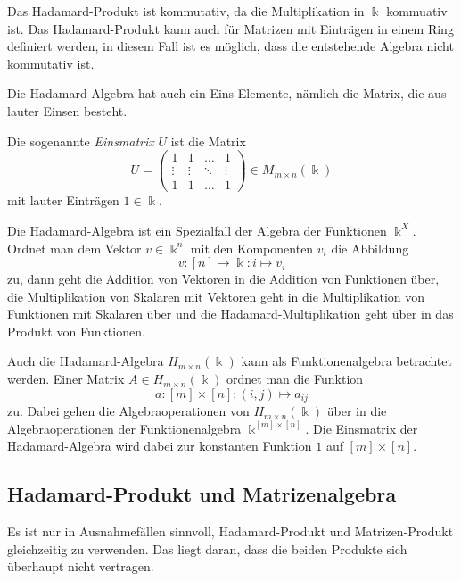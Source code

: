 Das Hadamard-Produkt ist kommutativ, da die Multiplikation in $\Bbbk$
kommuativ ist.
Das Hadamard-Produkt kann auch für Matrizen mit Einträgen in einem
Ring definiert werden, in diesem Fall ist es möglich, dass die entstehende
Algebra nicht kommutativ ist.

Die Hadamard-Algebra hat auch ein Eins-Elemente, nämlich die Matrix,
die aus lauter Einsen besteht.

\begin{definition}
Die sogenannte {\em Einsmatrix} $U$ ist die Matrix
\[
U=\begin{pmatrix}
1&1&\dots&1\\
\vdots&\vdots&\ddots&\vdots\\
1&1&\dots&1
\end{pmatrix}
\in
M_{m\times n}(\Bbbk)
\]
mit lauter Einträgen $1\in\Bbbk$.
\end{definition}

Die Hadamard-Algebra ist ein Spezialfall der Algebra der Funktionen
$\Bbbk^X$.
Ordnet man dem Vektor $v\in \Bbbk^n$ mit den Komponenten $v_i$ 
die Abbildung
\[
v\colon [n] \to \Bbbk: i \mapsto v_i
\]
zu, dann geht die Addition von Vektoren in die Addition von
Funktionen über, die Multiplikation von Skalaren mit Vektoren
geht in die Multiplikation von Funktionen mit Skalaren über 
und die Hadamard-Multiplikation geht über in das Produkt von
Funktionen.

Auch die Hadamard-Algebra $H_{m\times n}(\Bbbk)$ kann als Funktionenalgebra
betrachtet werden.
Einer Matrix $A\in H_{m\times n}(\Bbbk)$ ordnet man die Funktion
\[
a\colon [m]\times [n] : (i,j) \mapsto a_{i\!j}
\]
zu.
Dabei gehen die Algebraoperationen von $H_{m\times n}(\Bbbk)$ über
in die Algebraoperationen der Funktionenalgebra $\Bbbk^{[m]\times [n]}$.
Die Einsmatrix der Hadamard-Algebra wird dabei zur konstanten
Funktion $1$ auf $[m]\times[n]$.

\subsection{Hadamard-Produkt und Matrizenalgebra
\label{buch:vektorenmatrizen:subsection:vertraeglichkeit}}
Es ist nur in Ausnahmefällen sinnvoll, Hadamard-Produkt und Matrizen-Produkt
gleichzeitig zu verwenden.
Das liegt daran, dass die beiden Produkte sich überhaupt nicht 
vertragen.

